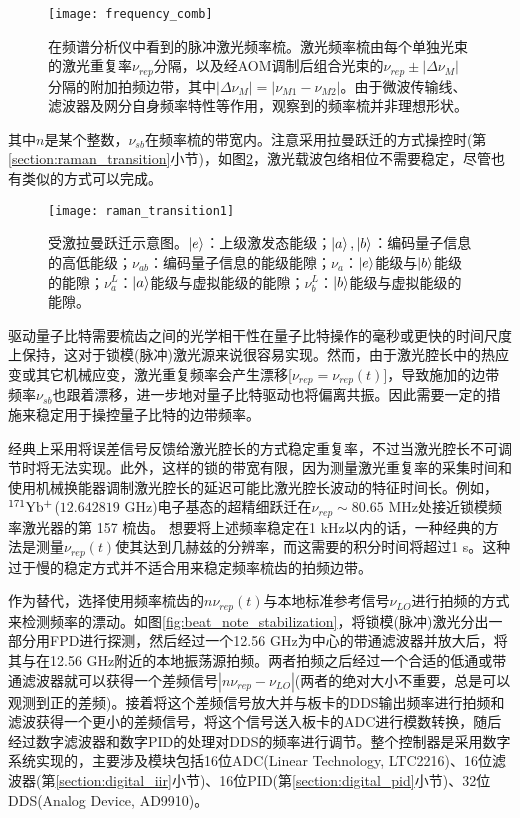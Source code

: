 \begin{figure}
    \centering
    \texttt{[image: frequency\_comb]}
    \caption[脉冲激光频率梳]{在频谱分析仪中看到的脉冲激光频率梳。激光频率梳由每个单独光束的激光重复率$\nu_{rep}$分隔，以及经AOM调制后组合光束的$\nu_{rep}\pm |\Delta \nu_M|$分隔的附加拍频边带，其中$|\Delta \nu_M|=|\nu_{M1}-\nu_{M2}|$。由于微波传输线、滤波器及网分自身频率特性等作用，观察到的频率梳并非理想形状。\label{fig:frequency_comb}}
\end{figure}
其中$n$是某个整数，$\nu_{sb}$在频率梳的带宽内。注意采用拉曼跃迁的方式操控时(第\ref{section:raman_transition}小节)，如图\ref{fig:raman_transition1}，激光载波包络相位不需要稳定\cite[]{Peer_Shapiro_Stowe_Shapiro_Ye_2007}，尽管也有类似的方式可以完成\cite[]{Koke_Grebing_Frei_Anderson_Assion_Steinmeyer_2010}。

\begin{figure}
    \centering
    \texttt{[image: raman\_transition1]}
    \caption[受激拉曼跃迁示意图]{受激拉曼跃迁示意图。$\ket{e}$：上级激发态能级；$\ket{a},\ket{b}$：编码量子信息的高低能级；$\nu_{ab}$：编码量子信息的能级能隙；$\nu_{a}$：$\ket{e}$能级与$\ket{b}$能级的能隙；$\nu_a^L$：$\ket{a}$能级与虚拟能级的能隙；$\nu_b^L$：$\ket{b}$能级与虚拟能级的能隙。\label{fig:raman_transition1}}
\end{figure}

驱动量子比特需要梳齿之间的光学相干性在量子比特操作的毫秒或更快的时间尺度上保持，这对于锁模(脉冲)激光源来说很容易实现\cite[]{Hayes_Matsukevich_Maunz_Hucul_Quraishi_Olmschenk_Campbell_Mizrahi_Senko_Monroe_2010}。然而，由于激光腔长中的热应变或其它机械应变，激光重复频率会产生漂移[$\nu_{rep}=\nu_{rep}(t)$]，导致施加的边带频率$\nu_{sb}$也跟着漂移，进一步地对量子比特驱动也将偏离共振。因此需要一定的措施来稳定用于操控量子比特的边带频率。

经典上采用将误差信号反馈给激光腔长的方式稳定重复率，不过当激光腔长不可调节时将无法实现。此外，这样的锁的带宽有限，因为测量激光重复率的采集时间和使用机械换能器调制激光腔长的延迟可能比激光腔长波动的特征时间长。例如，$\rm ^{171}Yb^+$($12.642819 $ GHz)电子基态的超精细跃迁在$ \nu_{rep} \sim 80.65$ MHz处接近锁模频率激光器的第 157 梳齿。
想要将上述频率稳定在1 kHz以内的话，一种经典的方法是测量$\nu_{rep}(t)$使其达到几赫兹的分辨率，而这需要的积分时间将超过1 s\cite[]{Islam_Campbell_Choi_Clark_Conover_Debnath_Edwards_Fields_Hayes_Hucul_et_al_2014}。这种过于慢的稳定方式并不适合用来稳定频率梳齿的拍频边带。

作为替代，选择使用频率梳齿的$n\nu_{rep}(t)$与本地标准参考信号$\nu_{LO}$进行拍频的方式来检测频率的漂动。如图\ref{fig:beat_note_stabilization}，将锁模(脉冲)激光分出一部分用FPD进行探测，然后经过一个12.56 GHz为中心的带通滤波器并放大后，将其与在12.56 GHz附近的本地振荡源拍频。两者拍频之后经过一个合适的低通或带通滤波器就可以获得一个差频信号$|n\nu_{rep}-\nu_{LO}|$(两者的绝对大小不重要，总是可以观测到正的差频)。接着将这个差频信号放大并与板卡的DDS输出频率进行拍频和滤波获得一个更小的差频信号，将这个信号送入板卡的ADC进行模数转换，随后经过数字滤波器和数字PID的处理对DDS的频率进行调节。整个控制器是采用数字系统实现的，主要涉及模块包括16位ADC(Linear Technology, LTC2216)、16位滤波器(第\ref{section:digital_iir}小节)、16位PID(第\ref{section:digital_pid}小节)、32位DDS(Analog Device, AD9910)。



